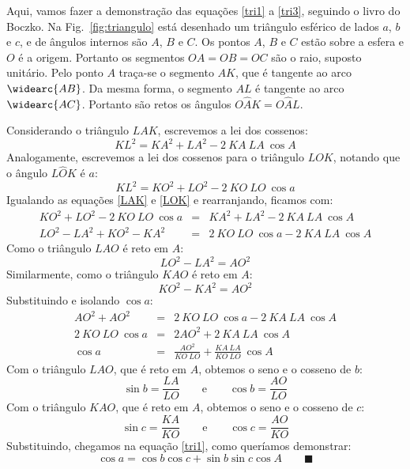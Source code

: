 Aqui, vamos fazer a demonstração das equações \ref{tri1} a \ref{tri3}, seguindo o livro do Boczko. Na Fig.~\ref{fig:triangulo} está desenhado um triângulo esférico de lados $a$, $b$ e $c$, e de ângulos internos são $A$, $B$ e $C$. Os pontos $A$, $B$ e $C$ estão sobre a esfera e $O$ é a origem. Portanto os segmentos $OA=OB=OC$ são o raio, suposto unitário. Pelo ponto $A$ traça-se o segmento $AK$, que é tangente ao arco $\widearc{AB}$. Da mesma forma, o segmento $AL$ é tangente ao arco $\widearc{AC}$. Portanto são retos os ângulos $O\hat{A}K=O\hat{A}L$.

Considerando o triângulo $LAK$, escrevemos a lei dos cossenos:
%
\begin{equation}
KL^2 = KA^2 + LA^2 - 2~KA~LA~\cos A \label{LAK}
\end{equation}
%
Analogamente, escrevemos a lei dos cossenos para o triângulo $LOK$, notando que o ângulo $L\hat{O}K$ é $a$:
%
\begin{equation}
KL^2 = KO^2 + LO^2 - 2~KO~LO~\cos a \label{LOK}
\end{equation}
%
Igualando as equações \ref{LAK} e \ref{LOK} e rearranjando, ficamos com:
%
\begin{eqnarray}
KO^2 + LO^2 - 2~KO~LO~\cos a &=& KA^2 + LA^2 - 2~KA~LA~\cos A \\
LO^2 - LA^2 + KO^2 - KA^2 &=& 2~KO~LO~\cos a - 2~KA~LA~\cos A
\end{eqnarray}
%
Como o triângulo $LAO$ é reto em $A$:
%
\begin{equation}
LO^2 - LA^2 = AO^2
\end{equation}
%
Similarmente, como o triângulo $KAO$ é reto em $A$:
%
\begin{equation}
KO^2 - KA^2 = AO^2
\end{equation}
%
Substituindo e isolando $\cos a$:
%
\begin{eqnarray}
AO^2 + AO^2 &=& 2~KO~LO~\cos a - 2~KA~LA~\cos A \\
2~KO~LO~\cos a &=& 2 AO^2 + 2~KA~LA~\cos A \\
\cos a &=& \frac{AO^2}{KO~LO} + \frac{KA~LA}{KO~LO}~\cos A
\end{eqnarray}
%
Com o triângulo $LAO$, que é reto em $A$, obtemos o seno e o cosseno de $b$:
%
\begin{equation}
\sin b = \frac{LA}{LO} \qquad \text{e} \qquad \cos b = \frac{AO}{LO}
\end{equation}
%
Com o triângulo $KAO$, que é reto em $A$, obtemos o seno e o cosseno de $c$:
%
\begin{equation}
\sin c = \frac{KA}{KO} \qquad \text{e} \qquad \cos c = \frac{AO}{KO}
\end{equation}
%
Substituindo, chegamos na equação \ref{tri1}, como queríamos demonstrar:
\[
\cos a = \cos b \cos c + \sin b \sin c \cos A \qquad \blacksquare
\]

